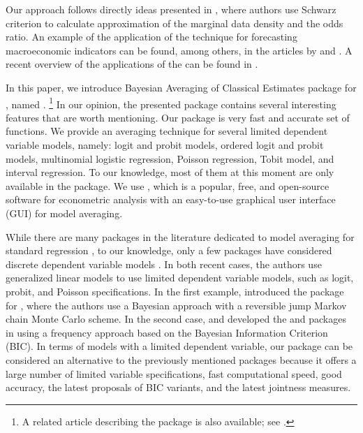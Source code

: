 Our approach follows directly ideas presented in
\cite{KassRaftery-BayesFactors-1995,SalaMartinDoppelhoferMiller_BACE, Bollen_2014},
where authors use Schwarz criterion to calculate approximation
of the marginal data density and the odds ratio. An example of
the application of the  technique for forecasting macroeconomic
indicators can be found, among others, in the articles by
\cite{vanDijk2004Forecasting, Moral_Benito_2012, AlbisMapa2014MPRA55902}
and \cite{BialowolskiKuszewskiWitkowski2015Empirica}. A recent
overview of the applications of the  can be found in \cite{Steel2020}.

In this paper, we introduce Bayesian Averaging of Classical
Estimates package for , named . \footnote{A related article 
	describing the package is also available; see \cite{JSSv117i04}.} In our
opinion, the presented  package contains several interesting
features that are worth mentioning. Our  package is
very fast and accurate set of functions. We provide an averaging
technique for several limited dependent variable models, namely:
logit and probit models, ordered logit and probit models,
multinomial logistic regression, Poisson regression, Tobit model,
and interval regression. To our knowledge, most of them at this moment are only
available in the  package. We use , which
is a popular, free, and open-source software for econometric
analysis with an easy-to-use graphical user interface (GUI) for model averaging.

While there are many packages in the literature dedicated to
model averaging for standard regression \citep{aminiparmeter2011,
	clydelittmanghosh_bas, JSSv068i04, RePEc:jss:jstsof:v:068:i05},
to our knowledge, only a few packages have considered discrete
dependent variable models \citep{JSSv104i02, rafteryhoetingvolinskypainteryeung_bma,
	sevcikovaraftery2022}. In both recent cases, the authors
use generalized linear models to use limited dependent
variable models, such as logit, probit, and Poisson specifications.
In the first example, \cite{JSSv104i02} introduced the 
package for , where the authors use a Bayesian
approach with a reversible jump Markov chain Monte Carlo scheme. 
In the second case, \cite{rafteryhoetingvolinskypainteryeung_bma}
and \cite{sevcikovaraftery2022} developed the  and
 packages in  using a frequency approach
based on the Bayesian Information Criterion (BIC). In terms of
models with a limited dependent variable, our package can be
considered an alternative to the previously mentioned packages
because it offers a large number of  limited variable specifications,
fast computational speed, good accuracy, the latest proposals
of BIC variants, and the latest jointness measures.

